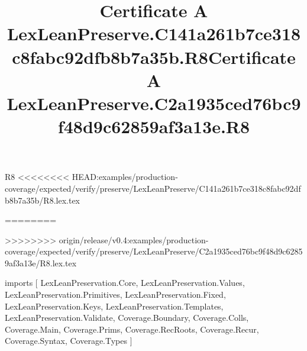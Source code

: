 \begin{lexlean}{R8}
<<<<<<<< HEAD:examples/production-coverage/expected/verify/preserve/LexLeanPreserve/C141a261b7ce318c8fabc92dfb8b7a35b/R8.lex.tex
\title{Certificate A LexLeanPreserve.C141a261b7ce318c8fabc92dfb8b7a35b.R8}
========
\title{Certificate A LexLeanPreserve.C2a1935ced76bc9f48d9c62859af3a13e.R8}
>>>>>>>> origin/release/v0.4:examples/production-coverage/expected/verify/preserve/LexLeanPreserve/C2a1935ced76bc9f48d9c62859af3a13e/R8.lex.tex
\begin{coremodule}
imports [
  LexLeanPreservation.Core,
  LexLeanPreservation.Values,
  LexLeanPreservation.Primitives,
  LexLeanPreservation.Fixed,
  LexLeanPreservation.Keys,
  LexLeanPreservation.Templates,
  LexLeanPreservation.Validate,
  Coverage.Boundary,
  Coverage.Colls,
  Coverage.Main,
  Coverage.Prims,
  Coverage.RecRoots,
  Coverage.Recur,
  Coverage.Syntax,
  Coverage.Types
]


\end{coremodule}
\end{lexlean}
